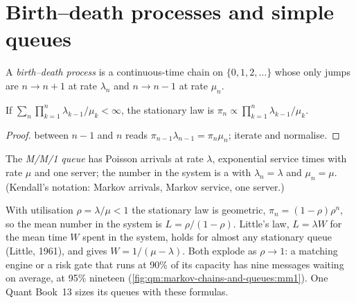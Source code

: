 \section{Birth--death processes and simple queues}

\begin{definition}\label{def:qm:markov-chains-and-queues:bd}
A \emph{birth--death process} is a continuous-time chain on $\{0, 1, 2, \dots\}$ whose only
jumps are $n \to n + 1$ at rate $\lambda_n$ and $n \to n - 1$ at rate $\mu_n$.
\end{definition}

\begin{proposition}\label{prop:qm:markov-chains-and-queues:bdstat}
If $\sum_n\prod_{k=1}^n\lambda_{k-1}/\mu_k < \infty$, the stationary law is $\pi_n \propto \prod_{k=1}^n\lambda_{k-1}/\mu_k$.
\end{proposition}

\begin{proof}
 between $n - 1$ and $n$ reads $\pi_{n-1}\lambda_{n-1} = \pi_n\mu_n$; iterate and normalise.
\end{proof}

\begin{definition}[M/M/1 queue]\label{def:qm:markov-chains-and-queues:mm1}
The \emph{M/M/1 queue} has Poisson arrivals at rate $\lambda$, exponential service times with
rate $\mu$ and one server; the number in the system is a  with $\lambda_n = \lambda$ and $\mu_n =
\mu$. (Kendall's notation: Markov arrivals, Markov service, one server.)
\end{definition}

With utilisation $\rho = \lambda/\mu < 1$ the stationary law is geometric, $\pi_n = (1 - \rho)\rho^n$, so the mean number in the
system is $L = \rho/(1 - \rho)$. Little's law, $L = \lambda W$ for the mean time $W$ spent in the system, holds for
almost any stationary queue (Little, 1961), and gives $W = 1/(\mu - \lambda)$. Both explode as $\rho \to 1$: a matching
engine or a risk gate that runs at 90\% of its capacity has nine messages waiting on average, at 95\%
nineteen (\cref{fig:qm:markov-chains-and-queues:mm1}). One Quant Book~13 sizes its queues with these
formulas.


